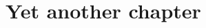 \chapter{Yet another chapter}
\startcontents[chapters]
\Mprintcontents


\begin{subappendices}

\end{subappendices}


\stopcontents[chapters]